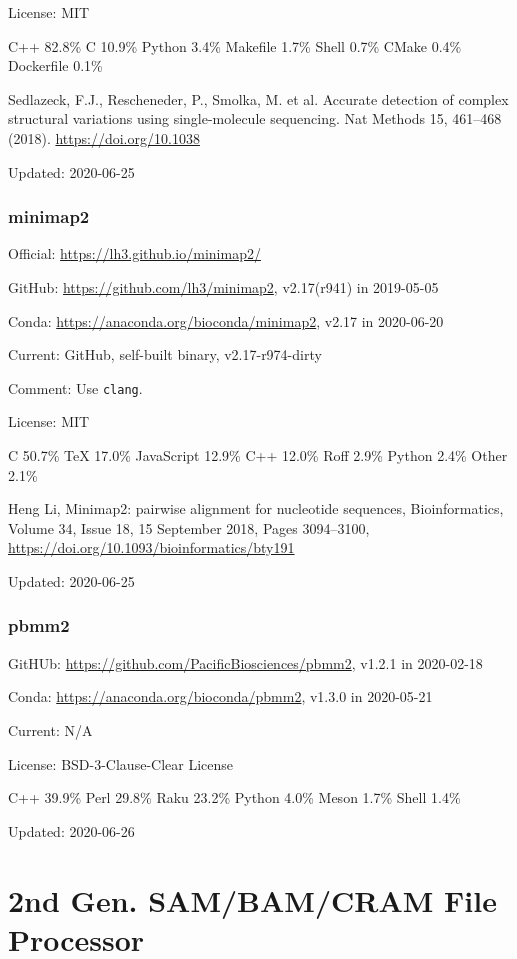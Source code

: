 \documentclass[]{article}
\begin{document}
License: MIT

C++ 82.8\% C 10.9\% Python 3.4\% Makefile 1.7\% Shell 0.7\% CMake 0.4\% Dockerfile 0.1\% 

Sedlazeck, F.J., Rescheneder, P., Smolka, M. et al. Accurate detection of complex structural variations using single-molecule sequencing. Nat Methods 15, 461–468 (2018). \url{https://doi.org/10.1038}

Updated: 2020-06-25

\section{minimap2}

Official: \url{https://lh3.github.io/minimap2/}

GitHub: \url{https://github.com/lh3/minimap2}, v2.17(r941) in 2019-05-05

Conda: \url{https://anaconda.org/bioconda/minimap2}, v2.17 in 2020-06-20

Current: GitHub, self-built binary, v2.17-r974-dirty

Comment: Use \verb|clang|.

License: MIT

C 50.7\% TeX 17.0\% JavaScript 12.9\% C++ 12.0\% Roff 2.9\% Python 2.4\% Other 2.1\%

Heng Li, Minimap2: pairwise alignment for nucleotide sequences, Bioinformatics, Volume 34, Issue 18, 15 September 2018, Pages 3094–3100, \url{https://doi.org/10.1093/bioinformatics/bty191}

Updated: 2020-06-25

\section{pbmm2}

GitHUb: \url{https://github.com/PacificBiosciences/pbmm2}, v1.2.1 in 2020-02-18

Conda: \url{https://anaconda.org/bioconda/pbmm2}, v1.3.0 in 2020-05-21

Current: N/A

License: BSD-3-Clause-Clear License

C++ 39.9\% Perl 29.8\% Raku 23.2\% Python 4.0\% Meson 1.7\% Shell 1.4\%

Updated: 2020-06-26

\part{2nd Gen. SAM/BAM/CRAM File Processor}
\end{document}
